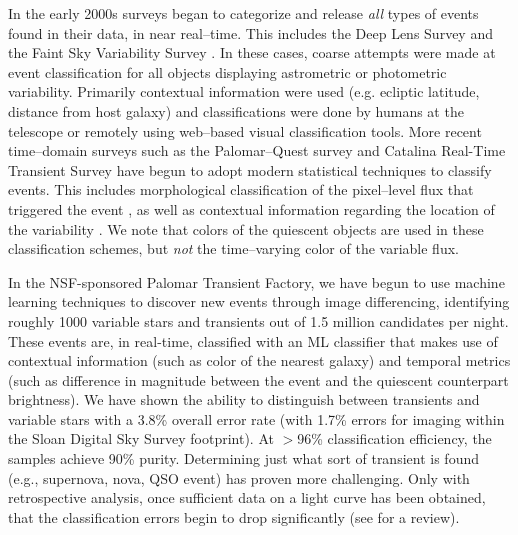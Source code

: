 
In the early 2000s surveys began to categorize and release {\it all} types of
events found in their data, in near real--time. This includes the Deep Lens
Survey \citep{2004ApJ...611..418B} and the Faint Sky Variability Survey
\citep{2003MNRAS.339..427G}.  In these cases, coarse attempts were made at event
classification for all objects displaying astrometric or photometric
variability. Primarily contextual information were used (e.g. ecliptic latitude,
distance from host galaxy) and classifications were done by humans at the
telescope or remotely using web--based visual classification tools.  More recent
time--domain surveys such as the Palomar--Quest survey
\citep{2008AN....329..263D} and Catalina Real-Time Transient Survey
\citep{2011arXiv1102.5004D} have begun to adopt modern statistical techniques to
classify events.  This includes morphological classification of the pixel--level
flux that triggered the event \citep{2008AIPC.1082..252D}, as well as contextual
information regarding the location of the variability
\citep{2010ASPC..434..115M}.  We note that colors of the quiescent objects are
used in these classification schemes, but {\it not} the time--varying color of
the variable flux.


In the NSF-sponsored Palomar Transient Factory, we have begun to use machine
learning techniques to discover new events through image differencing,
identifying roughly 1000 variable stars and transients out of 1.5 million
candidates per night. These events are, in real-time, classified with an ML
classifier that makes use of contextual information (such as color of the
nearest galaxy) and temporal metrics (such as difference in magnitude between
the event and the quiescent counterpart brightness). We have shown
\citep{2011arXiv1106.5491B} the ability to  distinguish between transients and
variable stars with a 3.8\% overall error rate (with 1.7\% errors for imaging
within the Sloan Digital Sky Survey footprint). At $>$96\% classification
efficiency, the samples achieve 90\% purity. Determining just what sort of
transient is found (e.g., supernova, nova, QSO event) has proven more
challenging. Only with retrospective analysis, once sufficient data on a light
curve has been obtained, that the classification errors begin to drop
significantly \citep{2011ApJ...733...10R} (see \citealt{2011arXiv1104.3142B} for
a review).

